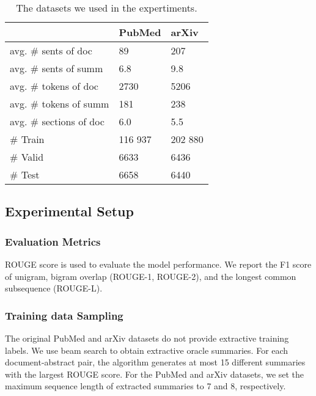 \begin{table}[h]
  \centering
  \begin{tabular}{l|p{12mm}p{12mm}}\toprule
                                & PubMed    &   arXiv       \\ \midrule
     avg. \# sents of doc        & 89        &   207         \\
     avg. \# sents of summ       & 6.8         &   9.8          \\
     avg. \# tokens of doc       & 2730      &   5206        \\
     avg. \# tokens of summ      & 181       &   238         \\
     avg. \# sections of doc     & 6.0      &   5.5         \\\midrule
     \# Train                   & 116 937   &   202 880      \\
     \# Valid                   & 6633      &   6436        \\
     \# Test                    & 6658      &   6440        \\
     \bottomrule
\end{tabular}
\caption{The datasets we used in the expertiments.}\label{tab:dataset}
\end{table}

\subsection{Experimental Setup}

\subsubsection{Evaluation Metrics}
ROUGE score \cite{rouge_2004} is used to evaluate the model performance.
We report the F1 score of unigram, bigram overlap (ROUGE-1, ROUGE-2), and the longest common subsequence (ROUGE-L).

\subsubsection{Training data Sampling}
The original PubMed and arXiv datasets do not provide extractive training labels.
We use beam search to obtain extractive oracle summaries. For each document-abstract pair, the algorithm generates at most 15 different summaries with the largest ROUGE score. For the PubMed and arXiv datasets, we set the maximum sequence length of extracted summaries to 7 and 8, respectively.

